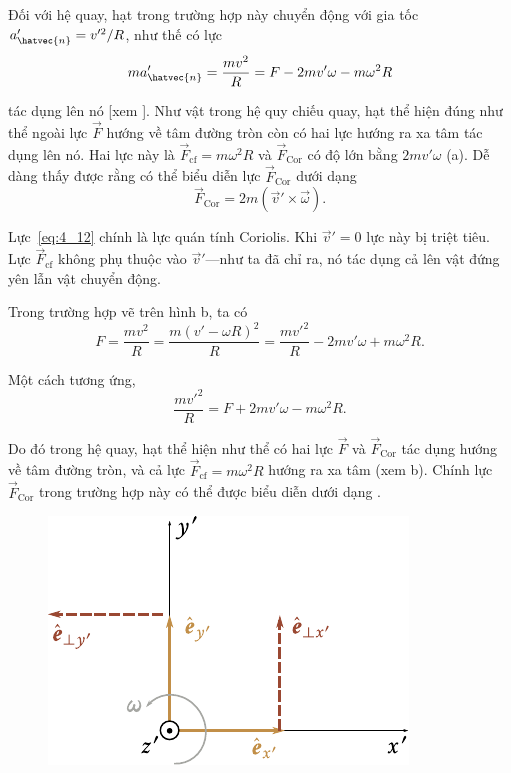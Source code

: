 \noindent
Đối với hệ quay, hạt trong trường hợp này chuyển động với gia tốc $a_{\hatvec{n}}'=v'^2/R$, như thế có lực
\begin{equation}\label{eq:4_11}
m a_{\hatvec{n}}' = \frac{mv^2}{R} = F - 2mv'\omega - m\omega^2 R
\end{equation}

\noindent
tác dụng lên nó [xem ]. Như vật trong hệ quy chiếu quay, hạt thể hiện đúng như thể ngoài lực $\vec{F}$ hướng về tâm đường tròn còn có hai lực hướng ra xa tâm tác dụng lên nó. Hai lực này là $\vec{F}_{\text{cf}}=m\omega^2 R$ và $\vec{F}_{\text{Cor}}$ có độ lớn bằng $2mv'\omega$ (a). Dễ dàng thấy được rằng có thể biểu diễn lực $\vec{F}_{\text{Cor}}$ dưới dạng
\begin{equation}\label{eq:4_12}
\vec{F}_{\text{Cor}} = 2m(\vec{v}'\times\vec{\omega}).
\end{equation}

\noindent
Lực~\eqref{eq:4_12} chính là lực quán tính Coriolis. Khi $\vec{v}'=0$ lực này bị triệt tiêu. Lực $\vec{F}_{\text{cf}}$ không phụ thuộc vào $\vec{v}'$---như ta đã chỉ ra, nó tác dụng cả lên vật đứng yên lẫn vật chuyển động.

Trong trường hợp vẽ trên hình b, ta có
\begin{equation*}
	F = \frac{mv^2}{R} = \frac{m(v'-\omega R)^2}{R} = \frac{mv'^2}{R} - 2mv'\omega + m\omega^2 R.
\end{equation*}

\noindent
Một cách tương ứng,
\begin{equation*}
\frac{mv'^2}{R} = F + 2mv'\omega - m\omega^2 R.
\end{equation*}

\noindent
Do đó trong hệ quay, hạt thể hiện như thể có hai lực $\vec{F}$ và $\vec{F}_{\text{Cor}}$ tác dụng hướng về tâm đường tròn, và cả lực $\vec{F}_{\text{cf}}=m\omega^2R$ hướng ra xa tâm (xem b). Chính lực $\vec{F}_{\text{Cor}}$ trong trường hợp này có thể được biểu diễn dưới dạng .

\begin{figure}[!htb]
	\begin{center}
		\includegraphics[scale=1]{figures/ch_04/fig_4_8.pdf}
		\caption[]{}
		\label{fig:4_8}
	\end{center}
\end{figure}

